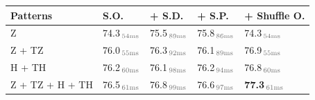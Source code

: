 \begin{tabular}{y{22mm}|x{14mm}x{14mm}x{14mm}x{14mm}}
\toprule
Patterns & S.O. & + S.D. & + S.P. &+ Shuffle O. \\
\midrule
Z &74.3$\,_\text{\textcolor{darkgray}{54ms}}$ &75.5$\,_\text{\textcolor{darkgray}{89ms}}$ &75.8$\,_\text{\textcolor{darkgray}{86ms}}$ &74.3$\,_\text{\textcolor{darkgray}{54ms}}$ \\
Z + TZ &76.0$\,_\text{\textcolor{darkgray}{55ms}}$ &76.3$\,_\text{\textcolor{darkgray}{92ms}}$ &76.1$\,_\text{\textcolor{darkgray}{89ms}}$ &76.9$\,_\text{\textcolor{darkgray}{55ms}}$ \\
H + TH &76.2$\,_\text{\textcolor{darkgray}{60ms}}$ &76.1$\,_\text{\textcolor{darkgray}{98ms}}$ &76.2$\,_\text{\textcolor{darkgray}{94ms}}$ &76.8$\,_\text{\textcolor{darkgray}{60ms}}$ \\
Z + TZ + H + TH &76.5$\,_\text{\textcolor{darkgray}{61ms}}$ &76.8$\,_\text{\textcolor{darkgray}{99ms}}$ &76.6$\,_\text{\textcolor{darkgray}{97ms}}$ &\textbf{77.3}$\,_\text{\textcolor{darkgray}{61ms}}$ \\
\bottomrule
\end{tabular}